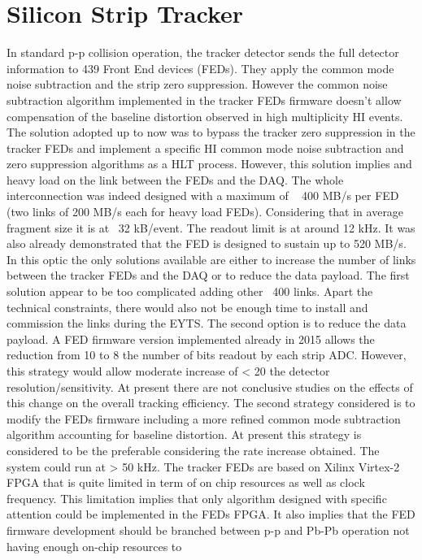 \section{Silicon Strip Tracker\label{sec:SiTracker}}
In standard p-p collision operation, the tracker detector sends the full detector information to 439 Front End devices
(FEDs). They apply the common mode noise subtraction and the strip zero suppression. However the common noise
subtraction algorithm implemented in the tracker FEDs firmware doesn’t allow compensation of the baseline distortion
observed in high multiplicity HI events. The solution adopted up to now was to bypass the tracker zero suppression in
the tracker FEDs and implement a specific HI common mode noise subtraction and zero suppression algorithms as a HLT
process. However, this solution implies and heavy load on the link between the FEDs and the DAQ.  The whole
interconnection was indeed designed with a maximum of ~ 400 MB/s per FED (two links of 200 MB/s each for heavy load
FEDs).  Considering that in average fragment size it is at ~32 kB/event. The readout limit is at around 12 kHz. It was
also already demonstrated that the FED is designed to sustain up to 520 MB/s. In this optic the only solutions available
are either to increase the number of links between the tracker FEDs and the DAQ or to reduce the data payload. The first
solution appear to be too complicated adding other ~400 links. Apart the technical constraints, there would also not be
enough time to install and commission the links during the EYTS. The second option is to reduce the data payload. A FED
firmware version implemented already in 2015 allows the reduction from 10 to 8 the number of bits readout by each strip
ADC. However, this strategy would allow moderate increase of < 20 %
the detector resolution/sensitivity. At present there are not conclusive studies on the effects of this change on the
overall tracking efficiency. The second strategy considered is to modify the FEDs firmware including a more refined
common mode subtraction algorithm accounting for baseline distortion.  At present this strategy is considered to be the
preferable considering the rate increase obtained. The system could run at > 50 kHz. The tracker FEDs are based on
Xilinx Virtex-2 FPGA that is quite limited in term of on chip resources as well as clock frequency. This limitation
implies that only algorithm designed with specific attention could be implemented in the FEDs FPGA. It also implies that
the FED firmware development should be branched between p-p and Pb-Pb operation not having enough on-chip resources to
